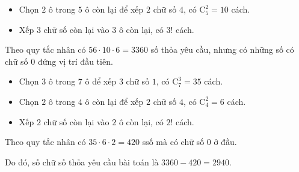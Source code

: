 \begin{bt}
{\begin{listEX}
\begin{description}
\begin{itemize}
					\item Chọn $2$ ô trong $5$ ô còn lại để xếp $2$ chữ số $4$,
					có $\mathrm{C}_5^2=10$ cách.
					\item Xếp $3$ chữ số còn lại vào $3$ ô còn lại, có
					$3!$ cách.
				\end{itemize}
				Theo quy tắc nhân có $56\cdot 10\cdot 6=3360$ số thỏa yêu cầu, nhưng có những số có chữ số $0$ đứng vị trí đầu tiên.
				\item [Trường hợp số $0$ ở ô đầu tiên.]
				\begin{itemize}
					\item Chọn $3$ ô trong $7$ ô để xếp $3$ chữ số $1$, có $\mathrm{C}_7^3=35$ cách.
					\item Chọn $2$ ô trong $4$ ô còn lại để xếp $2$ chữ số $4$,
					có $\mathrm{C}_4^2=6$ cách.
					\item Xếp $2$ chữ số còn lại vào $2$ ô còn lại, có
					$2!$ cách.
				\end{itemize}
				Theo quy tắc nhân có $35\cdot 6\cdot 2=420$ ssố mà có chữ số $0$ ở đầu.
			\end{description}
			Do đó, số chữ số thỏa yêu cầu bài toán là $3360-420=2940$.
		\end{listEX}
	}
\end{bt}
